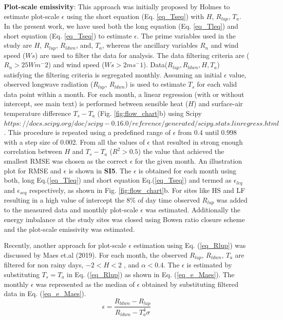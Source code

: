 \documentclass[fleqn,10pt]{wlscirep}
\begin{document}
{{\textbf{Plot-scale emissivity}:
This approach was initially proposed by Holmes\cite{holmes2009land} to estimate plot-scale $\epsilon$ using the short equation (Eq. \ref{eq_Tseq}) with $H$, $R_{lup}$, $T_{a}$. In the present work, we have used both the long equation (Eq. \ref{eq_Tleq}) and short equation (Eq. \ref{eq_Tseq}) to estimate $\epsilon$.
The prime variables used in the study are $H$, $R_{lup}$, $R_{ldwn}$, and, $T_{a}$, whereas the ancillary variables $R_{n}$ and wind speed ($Ws$) are used to filter the data for analysis. The data filtering criteria are ($R_{n} > 25 Wm^-2$) and wind speed ($Ws > 2ms^-1$)\cite{holmes_land_2009}. Data($R_{lup}, R_{ldwn}, H, T_{a}$) satisfying the filtering criteria is segregated monthly. Assuming an initial $\epsilon$ value, observed longwave radiation ($R_{lup}$, $R_{ldwn}$) is used to estimate $T_{s}$ for each valid data point within a month. For each month, a linear regression (with or without intercept, see main text) is performed between sensible heat ($H$) and surface-air temperature difference $T_{s}-T_{a}$ (Fig. \ref{fig:flow_chart}b) using Scipy $https://docs.scipy.org/doc/scipy-0.16.0/reference/generated/scipy.stats.linregress.html$. %
This procedure is repeated using a predefined range of $\epsilon$ from 0.4 until 0.998 with a step size of 0.002.
From all the values of $\epsilon$ that resulted in strong enough correlation between $H$ and $T_{s}-T_{a}$ ($R^{2}>0.5$) the value that achieved the smallest RMSE was chosen as the correct $\epsilon$ for the given month. An illustration plot for RMSE and $\epsilon$ is shown in \textbf{SI5}. The $\epsilon$ is obtained for each month using both, long Eq.(\ref{eq_Tleq}) and short equation Eq.(\ref{eq_Tseq}) and termed as $\epsilon_{leq}$ and $\epsilon_{seq}$ respectively, as shown in Fig. \ref{fig:flow_chart}b. 
For sites like HS and LF resulting in a high value of intercept the 8$\%$ of day time observed $R_{lup}$ was added to the measured data and monthly plot-scale $\epsilon$ was estimated. Additionally the energy imbalance at the study sites was closed using Bowen ratio closure scheme and the plot-scale emissivity was estimated. %

Recently, another approach for plot-scale $\epsilon$ estimation using Eq. (\ref{eq_Rlup}) was discussed by Maes et.al (2019)\cite{maes2019potential}. For each month, the observed $R_{lup}$,  $R_{ldwn}$, $T_{a}$  are filtered for non rainy days, $-2 < H <2$ , and $\alpha < 0.4$. The $\epsilon$ is estimated by substituting $T_{s} = T_{a}$ in Eq. (\ref{eq_Rlup}) as shown in Eq. (\ref{eq_e_Maes}). The monthly $\epsilon$  was represented as the median of $\epsilon$ obtained by substituting filtered data in Eq. (\ref{eq_e_Maes}). 
\begin{equation}\label{eq_e_Maes}
\epsilon = \frac{R_{ldwn} - R_{lup}}{R_{ldwn} - T_{a}^{4} \sigma}
\end{equation}

}}
\end{document}
